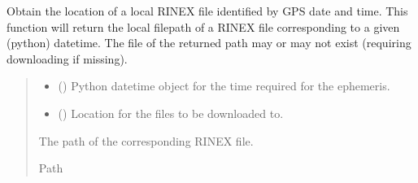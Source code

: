 \documentclass[letterpaper,10pt,english]{sphinxmanual}
\begin{document}
\begin{fulllineitems}
\label{\detokenize{modules/gps/ephemeris:qnav.gps.ephemeris.get_rinex_path}}
\pysigstartsignatures
{}
\pysigstopsignatures
\sphinxAtStartPar
Obtain the location of a local RINEX file identified by GPS date and time.
This function will return the local filepath of a RINEX file corresponding
to a given (python) datetime. The file of the returned path may or may not
exist (requiring downloading if missing).
\begin{quote}\begin{description}
\begin{itemize}
\item {} 
\sphinxAtStartPar
{} () \textendash{} Python datetime object for the time required for the ephemeris.

\item {} 
\sphinxAtStartPar
{} () \textendash{} Location for the files to be downloaded to.

\end{itemize}

\sphinxAtStartPar
The path of the corresponding RINEX file.

\sphinxAtStartPar
Path

\end{description}\end{quote}

\end{fulllineitems}

\end{document}
